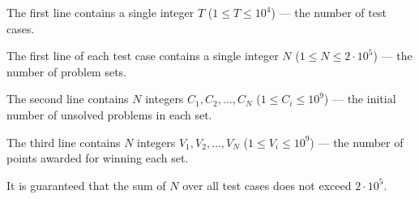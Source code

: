 The first line contains a single integer $T$ ($1 \le T \le 10^4$) --- the number of test cases.

The first line of each test case contains a single integer $N$ ($1 \le N \le 2 \cdot 10^5$) --- the number of problem sets.

The second line contains $N$ integers $C_1, C_2, \ldots, C_N$ ($1 \le C_i \le 10^9$) --- the initial number of unsolved problems in each set.

The third line contains $N$ integers $V_1, V_2, \ldots, V_N$ ($1 \le V_i \le 10^9$) --- the number of points awarded for winning each set.

It is guaranteed that the sum of $N$ over all test cases does not exceed $2 \cdot 10^5$.